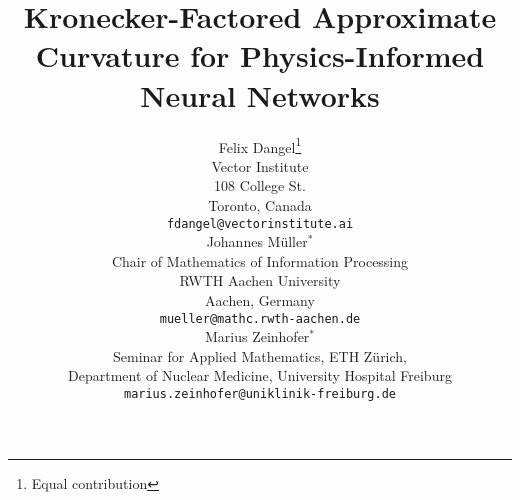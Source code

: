 \newcommand{\papertitle}{%
  Kronecker-Factored Approximate Curvature for Physics-Informed Neural Networks
}
\title{\papertitle}

%

\author{%
  Felix Dangel\thanks{Equal contribution}\\
  Vector Institute \\
  108 College St. \\
  Toronto, Canada \\
  \texttt{fdangel@vectorinstitute.ai} \\
  \And
  Johannes M\"uller$^*$\\
  Chair of Mathematics of Information Processing \\
  RWTH Aachen University \\
  Aachen, Germany \\
  \texttt{mueller@mathc.rwth-aachen.de} \\
  \And
  Marius Zeinhofer$^*$\\
  Seminar for Applied Mathematics, ETH Z\"urich, \\
  Department of Nuclear Medicine, University Hospital Freiburg\\
  \texttt{marius.zeinhofer@uniklinik-freiburg.de}
}
